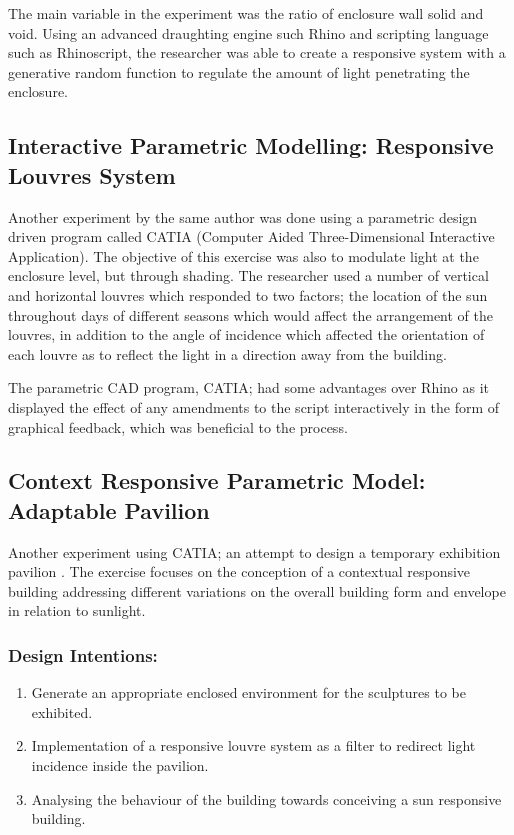 The main variable in the experiment was the ratio of enclosure wall solid and void. Using an advanced draughting engine such Rhino and scripting language such as Rhinoscript, the researcher was able to create a responsive system with a generative random function to regulate the amount of light penetrating the enclosure.

\subsection{Interactive Parametric Modelling: Responsive Louvres System}

Another experiment by the same author \cite{zulas04} was done using a parametric design driven program called CATIA (Computer Aided Three-Dimensional Interactive Application). The objective of this exercise was also to modulate light at the enclosure level, but through shading. The researcher used a number of vertical and horizontal louvres which responded to two factors; the location of the sun throughout days of different seasons which would affect the arrangement of the louvres, in addition to the angle of incidence which affected the orientation of each louvre as to reflect the light in a direction away from the building. 

The parametric CAD program, CATIA; had some advantages over Rhino as it displayed the effect of any amendments to the script interactively in the form of graphical feedback, which was beneficial to the process. 

\subsection{Context Responsive Parametric Model: Adaptable Pavilion}
\label{sec:AdptPav}

Another experiment using CATIA; an attempt to design a temporary exhibition pavilion \cite{zulas04}. The exercise focuses on the conception of a contextual responsive building addressing different variations on the overall building form and envelope in relation to sunlight. 

\subsubsection{Design Intentions:} 

\begin{enumerate}
\item Generate an appropriate enclosed environment for the sculptures to be exhibited.
\item Implementation of a responsive louvre system as a filter to redirect light incidence inside the pavilion.
\item Analysing the behaviour of the building towards conceiving a sun responsive building. 
\end{enumerate}

